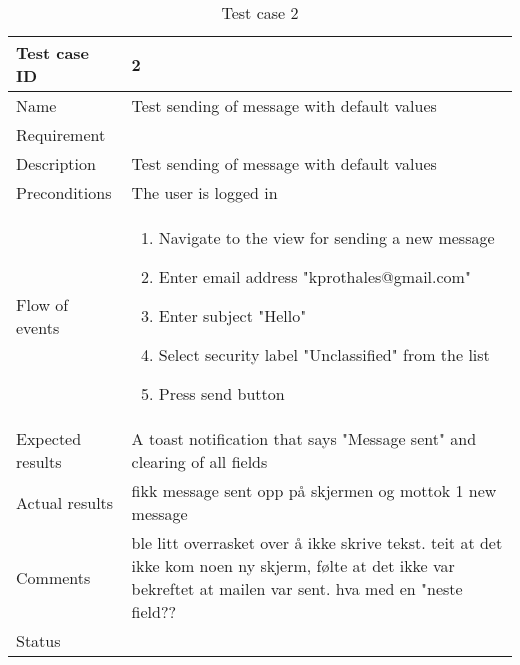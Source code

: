 \begin{table}
\begin{tabular}{l|p{10cm}}
Test case ID & 2 \\ \hline
Name & Test sending of message with default values\\ \hline
Requirement & \\ \hline
Description & Test sending of message with default values\\ \hline
Preconditions & The user is logged in\\ \hline
Flow of events & 
\begin{enumerate}
\item{}Navigate to the view for sending a new message
\item{}Enter email address "kprothales@gmail.com"
\item{}Enter subject "Hello"
\item{}Select security label "Unclassified" from the list
\item{}Press send button
\end{enumerate} \\ \hline
Expected results & A toast notification that says "Message sent" and clearing of all fields\\ \hline \hline
Actual results & fikk message sent opp på skjermen og mottok 1 new message\\ \hline
Comments & ble litt overrasket over å ikke skrive tekst. teit at det ikke kom noen ny skjerm, følte at det ikke var bekreftet at mailen var sent. hva med en "neste field?? \\ \hline
Status & 
\end{tabular}
\caption{Test case 2} \label{tab:case2}
\end{table}

